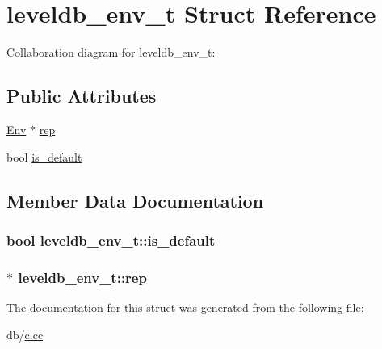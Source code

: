 \hypertarget{structleveldb__env__t}{\section{leveldb\-\_\-env\-\_\-t Struct Reference}
\label{structleveldb__env__t}
}


Collaboration diagram for leveldb\-\_\-env\-\_\-t\-:
\subsection*{Public Attributes}
\begin{DoxyCompactItemize}
\item 
\hyperlink{classleveldb_1_1_env}{Env} $\ast$ \hyperlink{structleveldb__env__t_ad41038b41aebaf7ffba1a4bbfaa8b539}{rep}
\item 
bool \hyperlink{structleveldb__env__t_a53e285385a628e932128aec1f0fe1dae}{is\-\_\-default}
\end{DoxyCompactItemize}


\subsection{Member Data Documentation}
\hypertarget{structleveldb__env__t_a53e285385a628e932128aec1f0fe1dae}{
\subsubsection[{is\-\_\-default}]{\setlength{\rightskip}{0pt plus 5cm}bool leveldb\-\_\-env\-\_\-t\-::is\-\_\-default}}\label{structleveldb__env__t_a53e285385a628e932128aec1f0fe1dae}
\hypertarget{structleveldb__env__t_ad41038b41aebaf7ffba1a4bbfaa8b539}{
\subsubsection[{rep}]{$\ast$ leveldb\-\_\-env\-\_\-t\-::rep}}\label{structleveldb__env__t_ad41038b41aebaf7ffba1a4bbfaa8b539}


The documentation for this struct was generated from the following file\-:\begin{DoxyCompactItemize}
\item 
db/\hyperlink{c_8cc}{c.\-cc}\end{DoxyCompactItemize}
